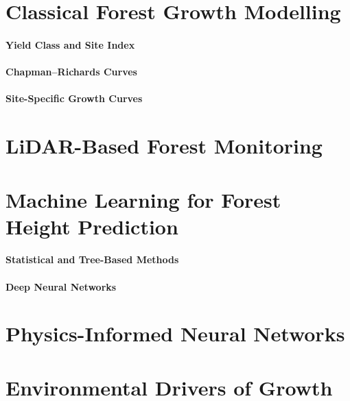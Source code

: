\documentclass[logo,msc]{Original/infthesis}           %
\begin{document}
\section{Classical Forest Growth Modelling}

\paragraph{Yield Class and Site Index}

\paragraph{Chapman--Richards Curves}

\paragraph{Site-Specific Growth Curves}

\section{LiDAR-Based Forest Monitoring}

\section{Machine Learning for Forest Height Prediction}

\paragraph{Statistical and Tree-Based Methods}

\paragraph{Deep Neural Networks}

\section{Physics-Informed Neural Networks}

\section{Environmental Drivers of Growth}
\end{document}
